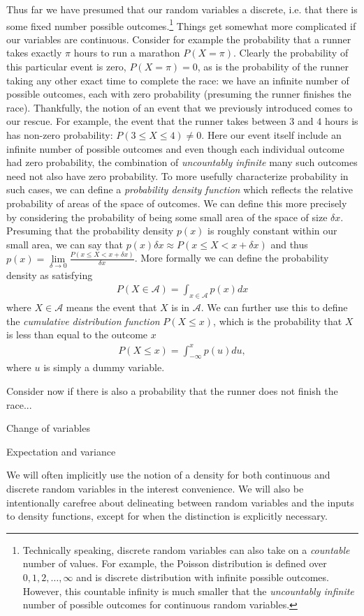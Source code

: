 Thus far we have presumed that our random variables a discrete, i.e. that there is some fixed
number possible outcomes.\footnote{Technically speaking, discrete random variables can also
	take on a \emph{countable} number of values.  For example, the Poisson distribution is defined
	over $0,1,2,\dots,\infty$ and is discrete distribution with infinite possible outcomes.  
	However, this countable infinity is much smaller that the \emph{uncountably infinite} number
	of possible outcomes for continuous random variables.}
Things get somewhat more complicated if our variables are continuous.  Consider for example
the probability that a runner takes exactly $\pi$ hours to run a marathon $P(X=\pi)$.  
Clearly the probability
of this particular event is zero, $P(X=\pi)=0$, as is the probability of the runner taking any other exact time
to complete the race: we have an infinite number of possible outcomes, each with zero probability
(presuming the runner finishes the race).  Thankfully, the notion of an event that we previously
introduced comes to our rescue.  For example, the event that the runner takes between $3$ and
$4$ hours is has non-zero probability: $P(3\le X \le 4) \neq 0$.  Here our event itself include
an infinite number of possible outcomes and even though each individual outcome had
zero probability, the combination of \emph{uncountably infinite} many such outcomes need
not also have zero probability.  To more usefully characterize probability in such cases, we can
define a \emph{probability density function} which reflects the relative probability of areas of
the space of outcomes.  We can define this more precisely by considering the probability
of being some small area of the space of size $\delta x$.  Presuming that the probability density
$p(x)$ is roughly constant within our small area, we can say that 
$p(x)\delta x \approx P(x\le X <x+\delta x)$ and thus 
$p(x) = \lim\limits_{\delta\rightarrow0} \frac{P(x\le X <x+\delta x)}{\delta x}$.  More formally
we can define the probability density as satisfying
\begin{align}
\label{eq:prob:density}
P(X\in \mathcal{A}) = \int_{x\in\mathcal{A}} p(x) dx
\end{align}
where $X\in \mathcal{A}$ means the event that $X$ is in $\mathcal{A}$.  We can further
use this to define the \emph{cumulative distribution function} $P(X\le x)$, which is the probability
that $X$ is less than equal to the outcome $x$
\begin{align}
\label{eq:prob:cumulative}
P(X\le x) = \int_{-\infty}^{x} p(u) du,
\end{align}
where $u$ is simply a dummy variable.

Consider now if there is also a probability that the runner does not finish the race...



Change of variables

Expectation and variance



We will often implicitly use the notion of a density 
for both continuous and discrete random variables in the interest
convenience.  We will also be intentionally carefree about delineating between random
variables and the inputs to density functions, except for when the distinction is explicitly necessary.
